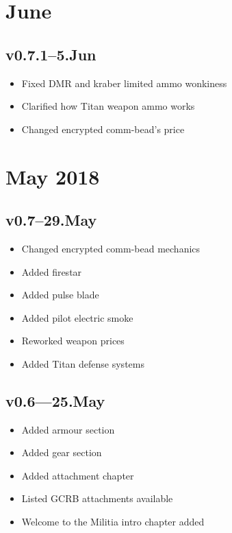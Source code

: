 \documentclass[9pt, openany]{extbook}
\begin{document}
{\small

\section{June}

\subsection{v0.7.1--5.Jun}
\begin{itemize}[noitemsep]
\item Fixed DMR and kraber limited ammo wonkiness
\item Clarified how Titan weapon ammo works
\item Changed encrypted comm-bead's price
\end{itemize}

\section{May 2018}

\subsection{v0.7--29.May}
\begin{itemize}[noitemsep]
\item Changed encrypted comm-bead mechanics
\item Added firestar
\item Added pulse blade
\item Added pilot electric smoke
\item Reworked weapon prices
\item Added Titan defense systems
\end{itemize}



\subsection{v0.6---25.May}
\begin{itemize}[noitemsep]
\item Added armour section
\item Added gear section
\item Added attachment chapter
\item Listed GCRB attachments available
\item Welcome to the Militia intro chapter added
\end{itemize}

}
\end{document}
